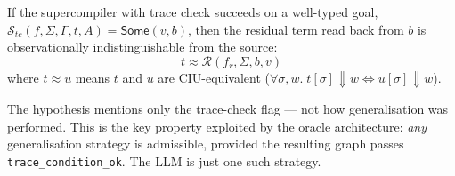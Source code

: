 \begin{theorem}
\label{thm:ciu}
If the supercompiler with trace check succeeds on a well-typed goal,
$\mathcal{S}_{\!\mathit{tc}}(f,\Sigma,\Gamma,t,A) = \mathsf{Some}(v,b)$,
then the residual term read back from $b$ is observationally indistinguishable
from the source:
\[
  t \approx \mathcal{R}(f_r,\Sigma,b,v)
\]
where $t \approx u$ means $t$ and $u$ are CIU-equivalent
($\forall\sigma,w.\; t[\sigma]\Downarrow w \iff u[\sigma]\Downarrow w$).
\end{theorem}

The hypothesis mentions only the trace-check flag --- not how generalisation
was performed.  This is the key property exploited by the oracle architecture:
\emph{any} generalisation strategy is admissible, provided the resulting graph
passes \texttt{trace\_condition\_ok}.  The LLM is just one such strategy.
